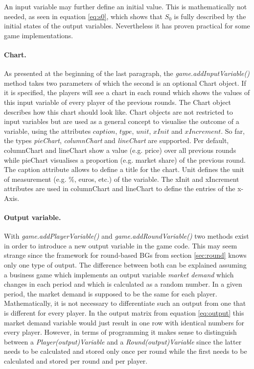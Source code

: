 An input variable may further define an initial value. This is mathematically not needed, as seen in equation \ref{eq:s0}, which shows that $S_0$ is fully described by the initial states of the output variables. Nevertheless it has proven practical for some game implementations.

\paragraph{Chart.} As presented at the beginning of the last paragraph, the \textit{game.addInputVariable()} method takes two parameters of which the second is an optional Chart object. If it is specified, the players will see a chart in each round which shows the values of this input variable of every player of the previous rounds. The Chart object describes how this chart should look like. Chart objects are not restricted to input variables but are used as a general concept to visualise the outcome of a variable, using the attributes $caption$, $type$, $unit$, $xInit$ and $xIncrement$. So far, the types \textit{pieChart}, \textit{columnChart} and \textit{lineChart} are supported. Per default, columnChart and lineChart show a value (e.g. price) over all previous rounds while pieChart visualises a proportion (e.g. market share) of the previous round. The caption attribute allows to define a title for the chart. Unit defines the unit of measurement (e.g. \%, euros, etc.) of the variable. The xInit and xIncrement attributes are used in columnChart and lineChart to define the entries of the x-Axis.

\paragraph{Output variable.} With \textit{game.addPlayerVariable()} and \textit{game.addRoundVariable()} two \newline  
methods exist in order to introduce a new output variable in the game code. This may seem strange since the framework for round-based BGs from section \ref{sec:round} knows only one type of output. The difference between both can be explained assuming a business game which implements an output variable \textit{market demand} which changes in each period and which is calculated as a random number. In a given period, the market demand is supposed to be the same for each player. Mathematically, it is not necessary to differentiate such an output from one that is different for every player. In the output matrix from equation \ref{eq:output} this market demand variable would just result in one row with identical numbers for every player. However, in terms of programming it makes sense to distinguish between a \textit{Player(output)Variable} and a \textit{Round(output)Variable} since the latter needs to be calculated and stored only once per round while the first needs to be calculated and stored per round and per player. 

